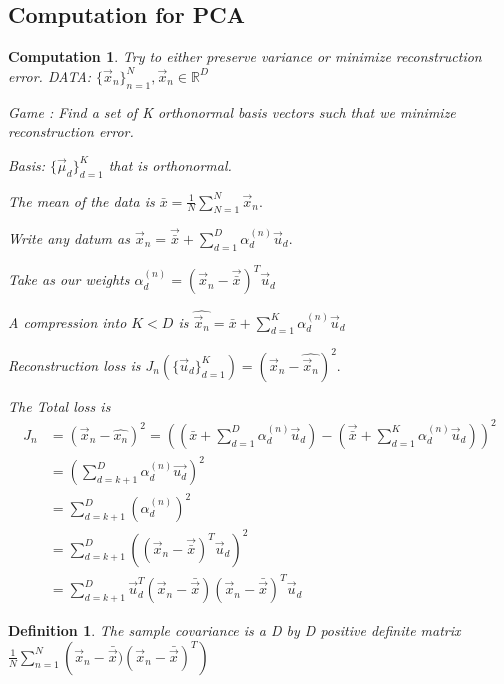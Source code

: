 \documentclass{amsart}
\newtheorem{comp}[subsubsection]{Computation}
\newtheorem{defn}[subsubsection]{Definition}
\begin{document}
\subsection{Computation for PCA}
\begin{comp}
Try to either preserve variance or minimize reconstruction error.
DATA: $\{\vec x_n\}_{n=1}^N, \vec x_n \in \mathbb R^D $

Game : Find a set of K orthonormal basis vectors such that we minimize reconstruction error.

Basis: $\{\vec \mu_d \}_{d=1}^K$ that is orthonormal.

The mean of the data is $\bar x = \frac 1 N \sum_{N=1}^N \vec x_n.$

Write any datum as $\vec x_n = \vec {\bar x}+ \sum_{d=1}^D \alpha_d^{(n)} \vec u_d.$

Take as our weights $\alpha_d^{(n)} = (\vec x_n - \vec{\bar x})^T \vec u_d$

A compression into $K<D$ is $\hat{\vec x_n} = \bar x + \sum_{d=1}^K \alpha_d^{(n)} \vec u_d$

Reconstruction loss is $J_n(\{\vec u_d\}_{d=1}^K) = (\vec x_n - \hat{\vec x_n})^2.$

The Total loss is 
\begin{align*}
J_n &= (\vec x_n - \hat{x_n})^2 = \left(\left({\bar x}+\sum_{d=1}^D \alpha_d^{(n)} \vec u_d\right) - \left(\vec {\bar x} + \sum_{d=1}^K \alpha_d^{(n)} \vec u_d \right)\right)^2 
\\
&= \left(\sum_{d=k+1}^D \alpha_d^{(n)}\vec {u_d}\right)^2 
\\
&= \sum_{d=k+1}^D (\alpha_d^{(n)})^2
\\
&= \sum_{d=k+1}^D ((\vec x_n - \vec{\bar x})^T \vec u_d)^2
\\
&= \sum_{d=k+1}^D \vec u_d^T (\vec x_n - \bar{\vec x})(\vec x_n - \bar{\vec x})^T \vec u_d
\end{align*}
\end{comp}

\begin{defn}
The sample covariance is a D by D positive definite matrix $\frac 1 N \sum_{n=1}^N\left(\vec x_n - \bar{\vec x})(\vec x_n - \bar{\vec x})^T\right)$
\end{defn}
\end{document}
